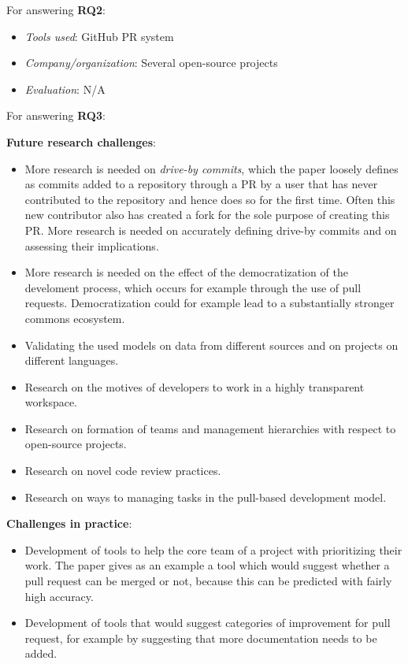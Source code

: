 \documentclass[]{book}
\providecommand{\tightlist}{%
  \setlength{\itemsep}{0pt}\setlength{\parskip}{0pt}}
\begin{document}
For answering \textbf{RQ2}:

\begin{itemize}
\tightlist
\item
  \emph{Tools used}: GitHub PR system
\item
  \emph{Company/organization}: Several open-source projects
\item
  \emph{Evaluation}: N/A
\end{itemize}

For answering \textbf{RQ3}:

\textbf{Future research challenges}:

\begin{itemize}
\tightlist
\item
  More research is needed on \emph{drive-by commits}, which the paper
  loosely defines as commits added to a repository through a PR by a
  user that has never contributed to the repository and hence does so
  for the first time. Often this new contributor also has created a fork
  for the sole purpose of creating this PR. More research is needed on
  accurately defining drive-by commits and on assessing their
  implications.
\item
  More research is needed on the effect of the democratization of the
  develoment process, which occurs for example through the use of pull
  requests. Democratization could for example lead to a substantially
  stronger commons ecosystem.
\item
  Validating the used models on data from different sources and on
  projects on different languages.
\item
  Research on the motives of developers to work in a highly transparent
  workspace.
\item
  Research on formation of teams and management hierarchies with respect
  to open-source projects.
\item
  Research on novel code review practices.
\item
  Research on ways to managing tasks in the pull-based development
  model.
\end{itemize}

\textbf{Challenges in practice}:

\begin{itemize}
\tightlist
\item
  Development of tools to help the core team of a project with
  prioritizing their work. The paper gives as an example a tool which
  would suggest whether a pull request can be merged or not, because
  this can be predicted with fairly high accuracy.
\item
  Development of tools that would suggest categories of improvement for
  pull request, for example by suggesting that more documentation needs
  to be added.
\end{itemize}
\end{document}
